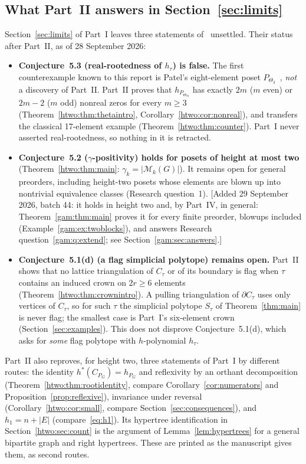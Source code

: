 \documentclass[11pt]{article}
\numberwithin{equation}{section}
\theoremstyle{definition}
\newcommand{\PM}{\mathcal M}
\begin{document}
\subsection{What Part~II answers in Section~\ref{sec:limits}}
\label{htwo:sec:answers}
Section~\ref{sec:limits} of Part~I leaves three statements of~\cite{AC}
unsettled. Their status after Part~II, as of 28 September 2026:
\begin{itemize}[leftmargin=1.4em]
\item \textbf{Conjecture~5.3 (real-rootedness of $h_\tau$) is false.} The
first counterexample known to this report is Patel's eight-element poset
$P_{\Theta_3}$~\cite{Patel}, \emph{not} a discovery of Part~II. Part~II proves
that $h_{P_{\Theta_m}}$ has exactly $2m$ ($m$ even) or $2m-2$ ($m$ odd)
nonreal zeros for every $m\ge3$ (Theorem~\ref{htwo:thm:thetaintro},
Corollary~\ref{htwo:cor:nonreal}), and transfers the classical
17-element example (Theorem~\ref{htwo:thm:counter}). Part~I never asserted
real-rootedness, so nothing in it is retracted.
\item \textbf{Conjecture~5.2 ($\gamma$-positivity) holds for posets of height
at most two} (Theorem~\ref{htwo:thm:main}: $\gamma_k=|\PM_k(G)|$). It remains
open for general preorders, including height-two posets whose elements are
blown up into nontrivial equivalence classes (Research question~1).
[Added 29 September 2026, batch 44: it holds in height two and, by Part~IV,
in general: Theorem~\ref{gam:thm:main} proves it for every finite preorder,
blowups included (Example~\ref{gam:ex:twoblocks}), and answers Research
question~\ref{gam:q:extend}; see Section~\ref{gam:sec:answers}.]
\item \textbf{Conjecture~5.1(d) (a flag simplicial polytope) remains open.}
Part~II shows that no lattice triangulation of $C_\tau$ or of its boundary is
flag when $\tau$ contains an induced crown on $2r\ge6$ elements
(Theorem~\ref{htwo:thm:crownintro}). A pulling triangulation of
$\partial C_\tau$ uses only vertices of $C_\tau$, so for such $\tau$ the
simplicial polytope $S_\tau$ of Theorem~\ref{thm:main} is never flag; the
smallest case is Part~I's six-element crown (Section~\ref{sec:examples}).
This does not disprove Conjecture~5.1(d), which asks for \emph{some} flag
polytope with $h$-polynomial $h_\tau$.
\end{itemize}
Part~II also reproves, for height two, three statements of Part~I by
different routes: the identity $h^*(C_{P_G})=h_{P_G}$ and reflexivity by an
orthant decomposition (Theorem~\ref{htwo:thm:rootidentity}, compare
Corollary~\ref{cor:numerators} and Proposition~\ref{prop:reflexive}),
invariance under reversal (Corollary~\ref{htwo:cor:small}, compare
Section~\ref{sec:consequences}), and $h_1=n+|E|$ (compare~\eqref{eq:h1}).
Its hypertree identification in Section~\ref{htwo:sec:count} is the argument
of Lemma~\ref{lem:hypertrees} for a general bipartite graph and right
hypertrees. These are printed as the manuscript gives them, as second routes.
\end{document}
